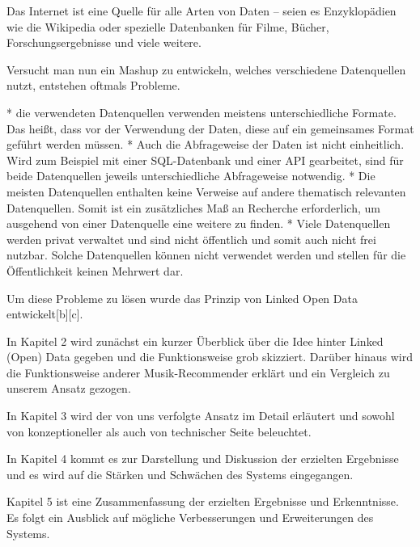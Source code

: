 Das Internet ist eine Quelle für alle Arten von Daten -- seien es Enzyklopädien wie die Wikipedia oder spezielle Datenbanken für Filme, Bücher, Forschungsergebnisse und viele weitere.


Versucht man nun ein Mashup zu entwickeln, welches verschiedene Datenquellen nutzt, entstehen oftmals Probleme.
\begin{list}
* die verwendeten Datenquellen verwenden meistens unterschiedliche Formate. Das heißt, dass vor der Verwendung der Daten, diese auf ein gemeinsames Format geführt werden müssen.
* Auch die Abfrageweise der Daten ist nicht einheitlich. Wird zum Beispiel mit einer SQL-Datenbank und einer API gearbeitet, sind für beide Datenquellen jeweils unterschiedliche Abfrageweise notwendig.
* Die meisten Datenquellen enthalten keine Verweise auf andere thematisch relevanten Datenquellen. Somit ist ein zusätzliches Maß an Recherche erforderlich, um ausgehend von einer Datenquelle eine weitere zu finden.
* Viele Datenquellen werden privat verwaltet und sind nicht öffentlich und somit auch nicht frei nutzbar. Solche Datenquellen können nicht verwendet werden und stellen für die Öffentlichkeit keinen Mehrwert dar.
\end{list}


Um diese Probleme zu lösen wurde das Prinzip von Linked Open Data entwickelt[b][c].


In Kapitel 2 wird zunächst ein kurzer Überblick über die Idee hinter Linked (Open) Data gegeben und die Funktionsweise grob skizziert. Darüber hinaus wird die Funktionsweise anderer Musik-Recommender erklärt und ein Vergleich zu unserem Ansatz gezogen.


In Kapitel 3 wird der von uns verfolgte Ansatz im Detail erläutert und sowohl von konzeptioneller als auch von technischer Seite beleuchtet.


In Kapitel 4 kommt es zur Darstellung und Diskussion der erzielten Ergebnisse und es wird auf die Stärken und Schwächen des Systems eingegangen.


Kapitel 5 ist eine Zusammenfassung der erzielten Ergebnisse und Erkenntnisse. Es folgt ein Ausblick auf mögliche Verbesserungen und Erweiterungen des Systems.